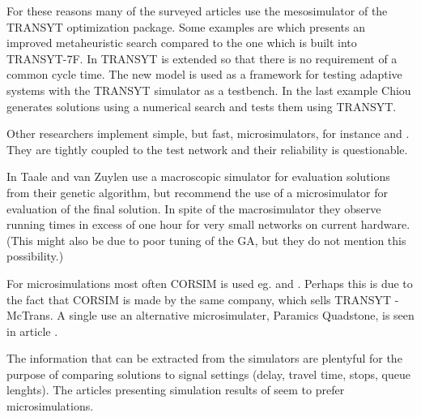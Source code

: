 For these reasons many of the surveyed articles use the mesosimulator of the TRANSYT optimization package. Some examples are \cite{26} which presents an improved metaheuristic search compared to the one which is built into TRANSYT-7F. In \cite{43} TRANSYT is extended so that there is no requirement of a common cycle time. The new model is used as a framework for testing adaptive systems with the TRANSYT simulator as a testbench.
In the last example Chiou \cite{34} generates solutions using a numerical search and tests them using TRANSYT.

Other researchers implement simple, but fast, microsimulators, for instance \cite{12} and \cite{42}. They are tightly coupled to the test network and their reliability is questionable.

In \cite{31} Taale and van Zuylen use a macroscopic simulator for evaluation solutions from their genetic algorithm, but recommend the use of a microsimulator for evaluation of the final solution. In spite of the macrosimulator they observe running times in excess of one hour for very small networks on current hardware. (This might also be due to poor tuning of the GA, but they do not mention this possibility.)

For microsimulations most often CORSIM is used eg.  \cite{1} and \cite{35}. Perhaps this is due to the fact that CORSIM is made by the same company, which sells TRANSYT - McTrans. A single use an alternative microsimulater, Paramics Quadstone, is seen in article \cite{21}.

The information that can be extracted from the simulators are plentyful for the purpose of comparing solutions to signal settings (delay, travel time, stops, queue lenghts). The articles presenting simulation results of seem to prefer microsimulations.